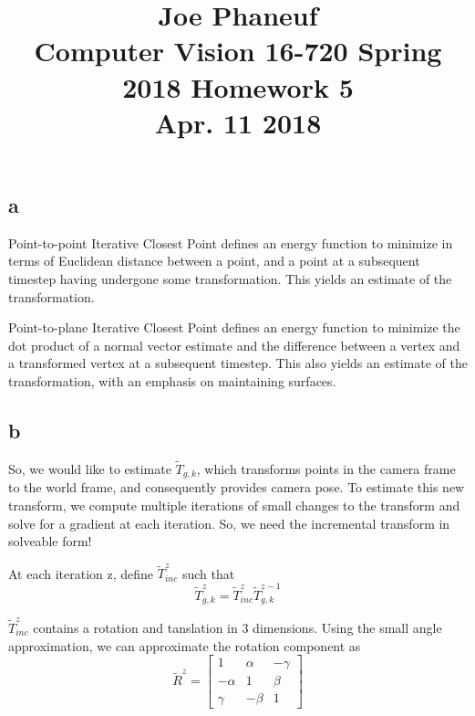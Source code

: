 \documentclass[12pt]{article}
\begin{document}
\title{Joe Phaneuf \\ Computer Vision 16-720 Spring 2018 Homework 5 \\ Apr. 11 2018 }
\date{}
\author{}
\maketitle

\newpage


\section{}
\subsection{a}
Point-to-point Iterative Closest Point defines an energy function to minimize in terms of Euclidean distance between a point, and a point at a subsequent timestep having undergone some transformation. This yields an estimate of the transformation. 

Point-to-plane Iterative Closest Point defines an energy function to minimize the dot product of a normal vector estimate and the difference between a vertex and a transformed vertex at a subsequent timestep. This also yields an estimate of the transformation, with an emphasis on maintaining surfaces.

\subsection{b}
So, we would like to estimate $\tilde{T}_{g,k}$, which transforms points in the camera frame to the world frame, and consequently provides camera pose.  
To estimate this new transform, we compute multiple iterations of small changes to the transform and solve for a gradient at each iteration. So, we need the incremental transform in solveable form!

At each iteration z, define $\tilde{T}_{inc}^{z}$ such that 
\begin{equation}
\tilde{T}_{g,k}^{z} = \tilde{T}_{inc}^{z} \tilde {T}_{g,k}^{z-1}
\end{equation}  
  
$\tilde{T}_{inc}^{z}$ contains a rotation and tanslation in 3 dimensions. Using the small angle approximation, we can approximate the rotation component as
\begin{equation}
\tilde{R}^{z} = 
\begin{bmatrix}
1 & \alpha & - \gamma \\
- \alpha & 1 & \beta \\
\gamma & - \beta & 1
\end{bmatrix}
\end{equation}
  
\end{document}
